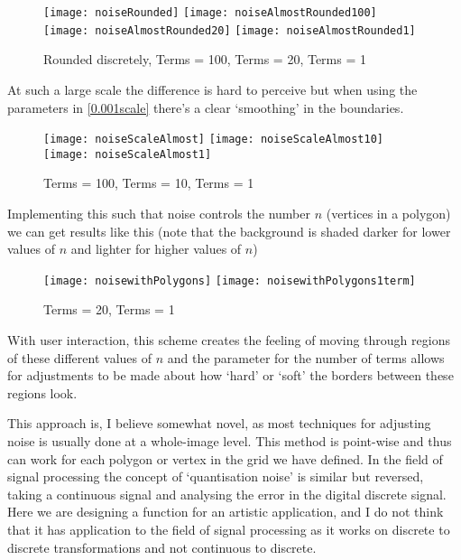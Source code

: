 \begin{figure}[H]
\centering
\texttt{[image: noiseRounded]}
\hspace{0.2cm}
\texttt{[image: noiseAlmostRounded100]}
\hspace{0.2cm}
\texttt{[image: noiseAlmostRounded20]}
\hspace{0.2cm}
\texttt{[image: noiseAlmostRounded1]}
\caption{Rounded discretely, Terms = 100, Terms = 20, Terms = 1}
\end{figure}

At such a large scale the difference is hard to perceive but when using the
parameters in \autoref{0.001scale} there's a clear `smoothing' in the
boundaries.

\begin{figure}[H]
\centering
\texttt{[image: noiseScaleAlmost]}
\hspace{0.2cm}
\texttt{[image: noiseScaleAlmost10]}
\hspace{0.2cm}
\texttt{[image: noiseScaleAlmost1]}
\caption{Terms = 100, Terms = 10, Terms = 1}
\end{figure}

Implementing this such that noise controls the number $n$ (vertices in a
polygon) we can get results like this (note that the background is shaded darker
for lower values of $n$ and lighter for higher values of $n$)
\begin{figure}[H]
\centering
\texttt{[image: noisewithPolygons]}
\hspace{0.2cm}
\texttt{[image: noisewithPolygons1term]}
\caption{Terms = 20, Terms = 1}
\end{figure}

With user interaction, this scheme creates the feeling of moving through regions
of these different values of $n$ and the parameter for the number of terms
allows for adjustments to be made about how `hard' or `soft' the borders between
these regions look.

This approach is, I believe somewhat novel, as most techniques for adjusting
noise is usually done at a whole-image level. This method is point-wise and thus
can work for each polygon or vertex in the grid we have defined. In the field of
signal processing the concept of `quantisation noise' is similar but reversed,
taking a continuous signal and analysing the error in the digital discrete
signal. Here we are designing a function for an artistic application, and I do
not think that it has application to the field of signal processing as it works
on discrete to discrete transformations and not continuous to discrete.

